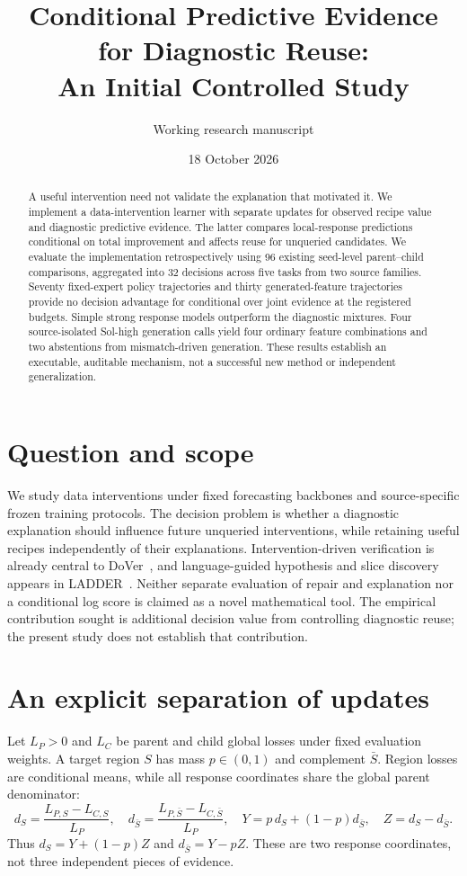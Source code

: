 \documentclass[10pt]{article}
\title{Conditional Predictive Evidence for Diagnostic Reuse:\\An Initial Controlled Study}
\author{Working research manuscript}
\date{18 October 2026}
\begin{document}
\maketitle
\begin{abstract}
A useful intervention need not validate the explanation that motivated it.
We implement a data-intervention learner with separate updates for observed recipe value and diagnostic predictive evidence.
The latter compares local-response predictions conditional on total improvement and affects reuse for unqueried candidates.
We evaluate the implementation retrospectively using 96 existing seed-level parent--child comparisons, aggregated into 32 decisions across five tasks from two source families.
Seventy fixed-expert policy trajectories and thirty generated-feature trajectories provide no decision advantage for conditional over joint evidence at the registered budgets.
Simple strong response models outperform the diagnostic mixtures.
Four source-isolated Sol-high generation calls yield four ordinary feature combinations and two abstentions from mismatch-driven generation.
These results establish an executable, auditable mechanism, not a successful new method or independent generalization.
\end{abstract}

\section{Question and scope}
We study data interventions under fixed forecasting backbones and source-specific frozen training protocols.
The decision problem is whether a diagnostic explanation should influence future unqueried interventions, while retaining useful recipes independently of their explanations.
Intervention-driven verification is already central to DoVer~\cite{dover}, and language-guided hypothesis and slice discovery appears in LADDER~\cite{ladder}.
Neither separate evaluation of repair and explanation nor a conditional log score is claimed as a novel mathematical tool.
The empirical contribution sought is additional decision value from controlling diagnostic reuse; the present study does not establish that contribution.

\section{An explicit separation of updates}
Let $L_P>0$ and $L_C$ be parent and child global losses under fixed evaluation weights.
A target region $S$ has mass $p\in(0,1)$ and complement $\bar S$.
Region losses are conditional means, while all response coordinates share the global parent denominator:
\[
 d_S=\frac{L_{P,S}-L_{C,S}}{L_P},\quad
 d_{\bar S}=\frac{L_{P,\bar S}-L_{C,\bar S}}{L_P},\quad
 Y=p\,d_S+(1-p)d_{\bar S},\quad Z=d_S-d_{\bar S}.
\]
Thus $d_S=Y+(1-p)Z$ and $d_{\bar S}=Y-pZ$.
These are two response coordinates, not three independent pieces of evidence.
\end{document}
